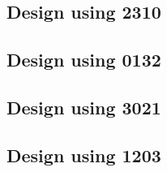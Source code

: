 \subsection{Design using 2310}


 \begin{center}




 \end{center}



\subsection{Design using 0132}


 \begin{center}




 \end{center}



\subsection{Design using 3021}


 \begin{center}




 \end{center}



\subsection{Design using 1203}


 \begin{center}




 \end{center}



